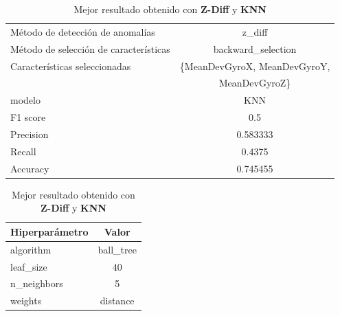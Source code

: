 \begin{appendices}
		\begin{table}[htb]
			\centering
			\caption{Mejor resultado obtenido con \textbf{Z-Diff} y \textbf{KNN}}
			\label{table:18}
			\begin{tabular}{lc}
				\toprule
					  Método de detección de anomalías &                                     z\_diff \\
				Método de selección de características &                         backward\_selection \\
						 Características seleccionadas & \{MeanDevGyroX, MeanDevGyroY, \\
						 							   & 							MeanDevGyroZ\}   \\
												modelo &                                        KNN \\
											  F1 score &                                        0.5 \\
											 Precision &                                   0.583333 \\
												Recall &                                     0.4375 \\
											  Accuracy &                                   0.745455 \\
				\bottomrule
			\end{tabular}
			\newline
			\newline

			\begin{tabular}{lc}
				\toprule
				Hiperparámetro &     Valor \\
				\midrule
					 algorithm & ball\_tree \\
					 leaf\_size &        40 \\
				   n\_neighbors &         5 \\
					   weights &  distance \\
				\bottomrule
			\end{tabular}
			
		\end{table}


\end{appendices}
